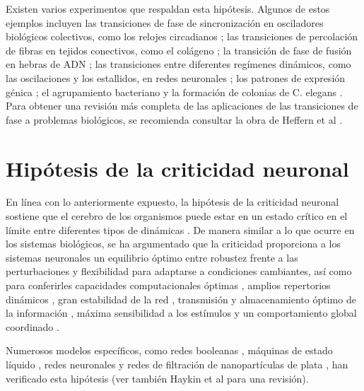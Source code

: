 Existen varios experimentos que respaldan esta hipótesis. Algunos de estos ejemplos incluyen las transiciones de fase de sincronización en osciladores biológicos colectivos, como los relojes circadianos \cite{garcia-ojalvo_modeling_2004}; las transiciones de percolación de fibras en tejidos conectivos, como el colágeno \cite{forgacs_phase_1991,newman_phase_2004,alvarado_molecular_2013}; la transición de fase de fusión en hebras de ADN \cite{magee_jr_theory_1963,li_phase_2006}; las transiciones entre diferentes regímenes dinámicos, como las oscilaciones y los estallidos, en redes neuronales \cite{kelso_phase_1984,freeman_metastability_2005,rabinovich_dynamical_2006,werner_metastability_2007,adamatzky_chaos_2013,haken_principles_1996}; los patrones de expresión génica \cite{tsuchiya_self-organizing_2016};  el agrupamiento bacteriano \cite{larkin_signal_2018,ordway_phase_2020}  y la formación de colonias de C. elegans \cite{chen_c_2021}. Para obtener una revisión más completa de las aplicaciones de las transiciones de fase a problemas biológicos, se recomienda consultar la obra de Heffern et al \cite{heffern_phase_2021}.



\section{Hipótesis de la criticidad neuronal}
En línea con lo anteriormente expuesto, la hipótesis de la criticidad neuronal sostiene que el cerebro de los organismos puede estar en un estado crítico en el límite entre diferentes tipos de dinámicas \cite{hesse_self-organized_2014}.  De manera similar a lo que ocurre en los sistemas biológicos, se ha argumentado que la criticidad proporciona a los sistemas neuronales un equilibrio óptimo entre robustez frente a las perturbaciones y flexibilidad para adaptarse a condiciones cambiantes, así como para conferirles capacidades computacionales óptimas \cite{legenstein_edge_2007,tagliazucchi_signatures_2017}, amplios repertorios dinámicos \cite{shew_neuronal_2009}, gran estabilidad de la red \cite{bertschinger_real-time_2004}, transmisión y almacenamiento óptimo de la información \cite{plenz_organizing_2007,beggs_criticality_2007,haldeman_critical_2005,lombardi_balance_2012,vazquez-rodriguez_stochastic_2017}, máxima sensibilidad a los estímulos \cite{kinouchi_optimal_2006,liu_plasticity_2015}  y un comportamiento global coordinado \cite{schneidman_weak_2006,beggs_neuronal_2003}.

Numerosos modelos específicos, como redes booleanas \cite{kauffman_emergent_1984,derrida_random_1986}, máquinas de estado líquido \cite{langton_computation_1990}, redes neuronales y redes de filtración de nanopartículas de plata \cite{carstens_brain-like_2022} , han verificado esta hipótesis (ver también Haykin et al \cite{haykin_what_2007} para una revisión). 

